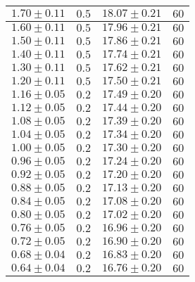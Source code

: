 \documentclass[../main.tex]{subfiles}
\begin{document}
\begin{tabular}{ ||c|c|c|c|| }
        \hline
        $1.70\pm 0.11$       & $0.5$       & $18.07\pm 0.21$  & $60$     \\
        \hline
        $1.60\pm 0.11$       & $0.5$       & $17.96\pm 0.21$  & $60$     \\
        \hline
        $1.50\pm 0.11$       & $0.5$       & $17.86\pm 0.21$ & $60$     \\
        \hline
        $1.40\pm 0.11$      & $0.5$       & $17.74\pm 0.21$  & $60$     \\
        \hline
        $1.30\pm 0.11$      & $0.5$       & $17.62\pm 0.21$  & $60$     \\
        \hline
        $1.20\pm 0.11$      & $0.5$       & $17.50\pm 0.21$    & $60$     \\
        \hline
        $1.16\pm 0.05$     & $0.2$       & $17.49\pm 0.20$  & $60$     \\
        \hline
        $1.12\pm 0.05$     & $0.2$       & $17.44\pm 0.20$  & $60$     \\
        \hline
        $1.08\pm0.05$     & $0.2$       & $17.39\pm 0.20$  & $60$     \\
        \hline
        $1.04\pm 0.05$     & $0.2$       & $17.34\pm 0.20$   & $60$     \\
        \hline
        $1.00\pm 0.05$        & $0.2$       & $17.30\pm 0.20$  & $60$     \\
        \hline
        $0.96\pm 0.05$     & $0.2$       & $17.24\pm 0.20$   & $60$     \\
        \hline
        $0.92\pm 0.05$     & $0.2$       & $17.20\pm 0.20$  & $60$     \\
        \hline
        $0.88\pm 0.05$     & $0.2$       & $17.13\pm 0.20$   & $60$     \\
        \hline
        $0.84\pm 0.05$     & $0.2$       & $17.08\pm 0.20$   & $60$     \\
        \hline
        $0.80\pm 0.05$      & $0.2$       & $17.02\pm 0.20$   & $60$     \\
        \hline
        $0.76\pm 0.05$     & $0.2$       & $16.96\pm 0.20$  & $60$     \\
        \hline
        $0.72\pm 0.05$     & $0.2$       & $16.90\pm 0.20$    & $60$     \\
        \hline
        $0.68\pm 0.04$     & $0.2$       & $16.83\pm 0.20$   & $60$     \\
        \hline
        $0.64\pm 0.04$     & $0.2$       & $16.76\pm 0.20$   & $60$     \\

\end{tabular}
\end{document}
